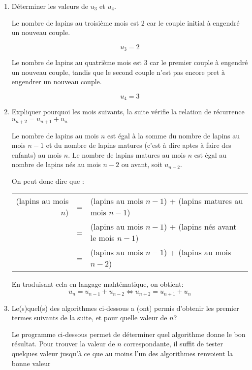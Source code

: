 \documentclass[10pt]{scrartcl}
\begin{document}
\begin{enumerate}[label=\textbf{\arabic*{}.}]
    \item Déterminer les valeurs de $u_3$ et $u_4$.
    
    Le nombre de lapins au troisième mois est 2 car le couple initial à engendré un nouveau couple.

    $$u_3 = 2$$

    Le nombre de lapins au quatrième mois est 3 car le premier couple à engendré un nouveau couple, tandis que le second couple n'est pas encore pret à engendrer un nouveau couple.

    $$u_4 = 3$$

    \item Expliquer pourquoi les mois suivants, la suite vérifie la relation de récurrence $u_{n+2} = u_{n+1} + u_n$

    Le nombre de lapins au mois $n$ est égal à la somme du nombre de lapins au mois $n-1$ et du nombre de lapins matures (c'est à dire aptes à faire des enfants) au mois $n$. Le nombre de lapins matures au mois $n$ est égal au nombre de lapins nés au mois $n-2$ ou avant, soit $u_{n-2}$.

    On peut donc dire que :

    \begin{tabular}{rcl}
        (lapins au mois $n$) & = & (lapins au mois $n-1$) + (lapins matures au mois $n-1$)\\
                            & = & (lapins au mois $n-1$) + (lapins nés avant le mois $n-1$)\\
                            & = & (lapins au mois $n-1$) + (lapins au mois $n-2$)\\[3ex]

    \end{tabular}

     
    En traduisant cela en langage mahtématique, on obtient: 
    $$u_n = u_{n-1} + u_{n-2} \iff u_{n+2} = u_{n+1} + u_n$$

    \item Le(s)quel(s) des algorithmes ci-dessous a (ont) permis d'obtenir les premier termes suivants de la suite, et pour quelle valeur de $n$?

    Le programme ci-dessous permet de déterminer quel algorithme donne le bon résultat. Pour trouver la valeur de $n$ correspondante, il suffit de tester quelques valeur jusqu'à ce que au moins l'un des algorithmes renvoient la bonne valeur
    
    

\end{enumerate}
\end{document}
